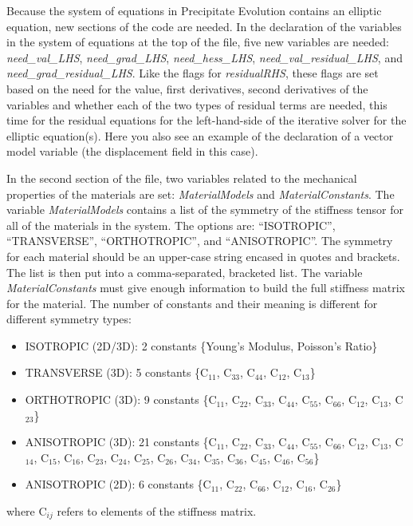 \documentclass[10pt]{article} %
\begin{document}
Because the system of equations in Precipitate Evolution contains an elliptic equation, new sections of the code are needed. In the declaration of the variables in the system of equations at the top of the file, five new variables are needed: \emph{need\_val\_LHS}, \emph{need\_grad\_LHS}, \emph{need\_hess\_LHS}, \emph{need\_val\_residual\_LHS}, and \emph{need\_grad\_residual\_LHS}. Like the flags for \emph{residualRHS}, these flags are set based on the need for the value, first derivatives, second derivatives of the variables and whether each of the two types of residual terms are needed, this time for the residual equations for the left-hand-side of the iterative solver for the elliptic equation(s). Here you also see an example of the declaration of a vector model variable (the displacement field in this case).

 In the second section of the file, two variables related to the mechanical properties of the materials are set: \emph{MaterialModels} and \emph{MaterialConstants}. The variable \emph{MaterialModels} contains a list of the symmetry of the stiffness tensor for all of the materials in the system. The options are: ``ISOTROPIC'', ``TRANSVERSE'', ``ORTHOTROPIC'', and ``ANISOTROPIC''. The symmetry for each material should be an upper-case string encased in quotes and brackets. The list is then put into a comma-separated, bracketed list. The variable \emph{MaterialConstants} must give enough information to build the full stiffness matrix for the material. The number of constants and their meaning is different for different symmetry types:
 \begin{itemize}
\item ISOTROPIC (2D/3D): 2 constants \{Young's Modulus, Poisson's Ratio\}
\item TRANSVERSE (3D): 5 constants \{C$_{11}$, C$_{33}$, C$_{44}$, C$_{12}$, C$_{13}$\}
\item ORTHOTROPIC (3D): 9 constants \{C$_{11}$, C$_{22}$, C$_{33}$, C$_{44}$, C$_{55}$, C$_{66}$, C$_{12}$, C$_{13}$, C$_{23}$\}
\item ANISOTROPIC (3D): 21 constants \{C$_{11}$, C$_{22}$, C$_{33}$, C$_{44}$, C$_{55}$, C$_{66}$, C$_{12}$, C$_{13}$, C$_{14}$, C$_{15}$, C$_{16}$, C$_{23}$, C$_{24}$, C$_{25}$, C$_{26}$, C$_{34}$, C$_{35}$, C$_{36}$, C$_{45}$, C$_{46}$, C$_{56}$\}
\item ANISOTROPIC (2D): 6 constants \{C$_{11}$, C$_{22}$, C$_{66}$, C$_{12}$, C$_{16}$, C$_{26}$\}
\end{itemize}
where C$_{ij}$ refers to elements of the stiffness matrix.
\end{document}
